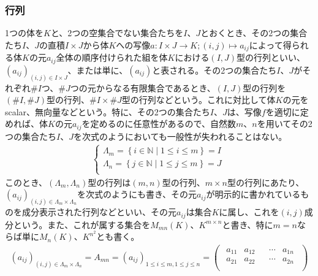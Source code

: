 \documentclass[dvipdfmx]{jsarticle}
\begin{document}
\subsubsection{行列}%
\begin{dfn}
1つの体を$K$と、2つの空集合でない集合たちを$I$、$J$とおくとき、その2つの集合たち$I$、$J$の直積$I \times J$から体$K$への写像$a:I \times J \rightarrow K;(i,j) \mapsto a_{ij}$によって得られる体$K$の元$a_{ij}$全体の順序付けられた組を体$K$における$(I,J)$型の行列といい、$\left( a_{ij} \right)_{(i,j) \in I \times J}$、または単に、$\left( a_{ij} \right)$と表される。その2つの集合たち$I$、$J$がそれぞれ${\#}I$つ、${\#}J$つの元からなる有限集合であるとき、$(I,J)$型の行列を$\left( {\#}I,{\#}J \right)$型の行列、${\#}I \times {\#}J$型の行列などという。これに対比して体$K$の元をscalar、無向量などという。特に、その2つの集合たち$I$、$J$は、写像$f$を適切に定めれば、体$K$の元$a_{ij}$を定めるのに任意性があるので、自然数$m$、$n$を用いてその2つの集合たち$I$、$J$を次式のようにおいても一般性が失われることはない。
\begin{align*}
\left\{ \begin{matrix}
\varLambda_{m} = \left\{ i \in \mathbb{N} \middle| 1 \leq i \leq m \right\} = I \\
\varLambda_{n} = \left\{ j \in \mathbb{N} \middle| 1 \leq j \leq m \right\} = J \\
\end{matrix} \right.\ 
\end{align*}
このとき、$\left( \varLambda_{m},\varLambda_{n} \right)$型の行列は$(m,n)$型の行列、$m \times n$型の行列にあたり、$\left( a_{ij} \right)_{(i,j) \in \varLambda_{m} \times \varLambda_{n}}$を次式のようにも書き、その元$a_{ij}$が明示的に書かれているものを成分表示された行列などといい、その元$a_{ij}$は集合$K$に属し、これを$(i,j)$成分という。また、これが属する集合を$M_{mn}(K)$、$K^{m \times n}$と書き、特に$m = n$ならば単に$M_{n}(K)$、$K^{n^{2}}$とも書く。
\begin{align*}
\left( a_{ij} \right)_{(i,j) \in \varLambda_{m} \times \varLambda_{n}} = A_{mn} = \left( a_{ij} \right)_{1 \leq i \leq m,1 \leq j \leq n} = \begin{pmatrix}
\begin{matrix}
a_{11} & a_{12} \\
a_{21} & a_{22} \\
\end{matrix} & \begin{matrix}
\cdots & a_{1n} \\
\cdots & a_{2n} \\

\end{matrix}
\end{pmatrix}
\end{align*}
\end{dfn}
\end{document}

